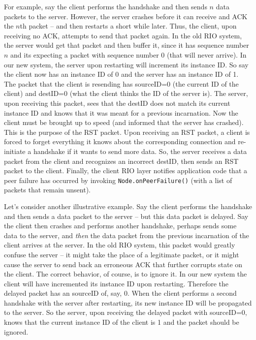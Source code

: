 \documentclass[12pt]{article}	%
\begin{document}
For example, say the client performs the handshake and then sends $n$ data packets to the server. However, the server crashes before it can receive and ACK the $n$th packet -- and then restarts a short while later. Thus, the client, upon receiving no ACK, attempts to send that packet again. In the old RIO system, the server would get that packet and then buffer it, since it has sequence number $n$ and its expecting a packet with sequence number 0 (that will never arrive). In our new system, the server upon restarting will increment its instance ID. So say the client now has an instance ID of 0 and the server has an instance ID of 1. The packet that the client is resending has sourceID=0 (the current ID of the client) and destID=0 (what the client thinks the ID of the server is). The server, upon receiving this packet, sees that the destID does not match its current instance ID and knows that it was meant for a previous incarnation. Now the client must be brought up to speed (and informed that the server has crashed). This is the purpose of the RST packet. Upon receiving an RST packet, a client is forced to forget everything it knows about the corresponding connection and re-initiate a handshake if it wants to send more data. So, the server receives a data packet from the client and recognizes an incorrect destID, then sends an RST packet to the client. Finally, the client RIO layer notifies application code that a peer failure has occurred by invoking {\tt Node.onPeerFailure()} (with a list of packets that remain unsent).

Let's consider another illustrative example. Say the client performs the handshake and then sends a data packet to the server -- but this data packet is delayed. Say the client then crashes and performs another handshake, perhaps sends some data to the server, and \emph{then} the data packet from the previous incarnation of the client arrives at the server. In the old RIO system, this packet would greatly confuse the server -- it might take the place of a legitimate packet, or it might cause the server to send back an erroneous ACK that further corrupts state on the client. The correct behavior, of course, is to ignore it. In our new system the client will have incremented its instance ID upon restarting. Therefore the delayed packet has an sourceID of, say, 0. When the client performs a second handshake with the server after restarting, its new instance ID will be propagated to the server. So the server, upon receiving the delayed packet with sourceID=0, knows that the current instance ID of the client is 1 and the packet should be ignored.
\end{document}
